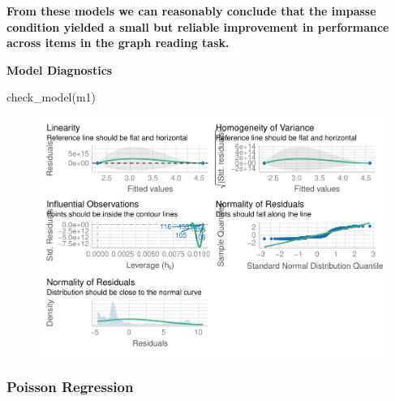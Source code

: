 \documentclass[
  letterpaper,
  DIV=11,
  numbers=noendperiod]{scrreprt}
\newenvironment{Shaded}{\begin{snugshade}}{\end{snugshade}}
\newcommand{\FunctionTok}[1]{\textcolor[rgb]{0.28,0.35,0.67}{#1}}
\newcommand{\NormalTok}[1]{\textcolor[rgb]{0.00,0.23,0.31}{#1}}
\begin{document}
\begin{tcolorbox}[standard jigsaw,colframe=quarto-callout-note-color-frame, arc=.35mm, titlerule=0mm, toptitle=1mm, bottomtitle=1mm, rightrule=.15mm, title=\textcolor{quarto-callout-note-color}{\faInfo}\hspace{0.5em}{Note}, leftrule=.75mm, toprule=.15mm, bottomrule=.15mm, opacityback=0, colbacktitle=quarto-callout-note-color!10!white, left=2mm, opacitybacktitle=0.6, coltitle=black, colback=white]
\textbf{From these models we can reasonably conclude that the impasse
condition yielded a small but reliable improvement in performance across
items in the graph reading task.}
\end{tcolorbox}

\textbf{Model Diagnostics}

\begin{Shaded}
\begin{Highlighting}[]
\FunctionTok{check\_model}\NormalTok{(m1)}
\end{Highlighting}
\end{Shaded}

\begin{figure}[H]

{\centering \includegraphics{analysis/SGC3A/4_sgc3A_hypotesting_files/figure-pdf/DIAGNOSTICS-ABSCORE-LINEAR-1.pdf}

}

\end{figure}

\hypertarget{poisson-regression}{%
\subsubsection{Poisson Regression}\label{poisson-regression}}
\end{document}
